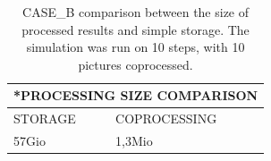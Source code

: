 \begin{table}[!h]
\centering
\begin{tabular}{|p{3.5cm}|p{3.5cm}|}
\hline
\multicolumn{2}{|c|}{\textbf{*PROCESSING SIZE COMPARISON}}\\
\hline
STORAGE & COPROCESSING \\
\hline 
57Gio & 1,3Mio \\
\hline 
\end{tabular} 
\caption{CASE\_B comparison between the size of processed results and simple storage. The simulation was run on 10 steps, with 10
pictures coprocessed.}
\label{fig:size_tab}
\end{table}



